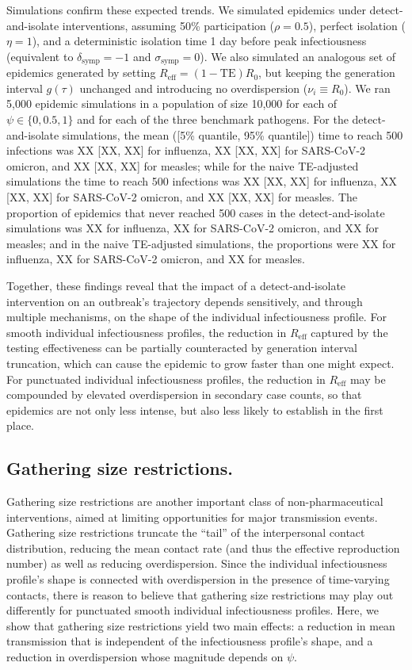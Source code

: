 Simulations confirm these expected trends. We simulated epidemics under detect-and-isolate interventions, assuming 50\% participation ($\rho= 0.5$), perfect isolation ($\eta = 1$), and a deterministic isolation time 1 day before peak infectiousness (equivalent to $\delta_\text{symp} = -1$ and $\sigma_\text{symp} = 0$). We also simulated an analogous set of epidemics generated by setting $R_\text{eff} = (1-\text{TE})R_0$, but keeping the generation interval $g(\tau)$ unchanged and introducing no overdispersion ($\nu_i \equiv R_0$). We ran 5,000 epidemic simulations in a population of size 10,000 for each of $\psi \in \{0, 0.5, 1\}$ and for each of the three benchmark pathogens. For the detect-and-isolate simulations, the mean ([5\% quantile, 95\% quantile]) time to reach 500 infections was XX [XX, XX] for influenza, XX [XX, XX] for SARS-CoV-2 omicron, and XX [XX, XX] for measles; while for the naive TE-adjusted simulations the time to reach 500 infections was XX [XX, XX] for influenza, XX [XX, XX] for SARS-CoV-2 omicron, and XX [XX, XX] for measles. The proportion of epidemics that never reached 500 cases in the detect-and-isolate simulations was XX for influenza, XX for SARS-CoV-2 omicron, and XX for measles; and in the naive TE-adjusted simulations, the proportions were XX for influenza, XX for SARS-CoV-2 omicron, and XX for measles. 

Together, these findings reveal that the impact of a detect-and-isolate intervention on an outbreak's trajectory depends sensitively, and through multiple mechanisms, on the shape of the individual infectiousness profile. For smooth individual infectiousness profiles, the reduction in $R_\text{eff}$ captured by the testing effectiveness can be partially counteracted by generation interval truncation, which can cause the epidemic to grow faster than one might expect. For punctuated individual infectiousness profiles, the reduction in $R_\text{eff}$ may be compounded by elevated overdispersion in secondary case counts, so that epidemics are not only less intense, but also less likely to establish in the first place. 

\subsection{Gathering size restrictions.}

Gathering size restrictions are another important class of non-pharmaceutical interventions, aimed at limiting opportunities for major transmission events. Gathering size restrictions truncate the ``tail'' of the interpersonal contact distribution, reducing the mean contact rate (and thus the effective reproduction number) as well as reducing overdispersion. Since the individual infectiousness profile's shape is connected with overdispersion in the presence of time-varying contacts, there is reason to believe that gathering size restrictions may play out differently for punctuated \vs smooth individual infectiousness profiles. Here, we show that gathering size restrictions yield two main effects: a reduction in mean transmission that is independent of the infectiousness profile's shape, and a reduction in overdispersion whose magnitude depends on $\psi$.


